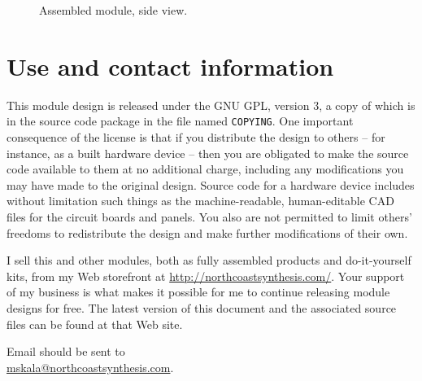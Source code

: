 \begin{figure}
{\centering
{}\par}
\caption{Assembled module, side view.}\label{fig:panel-stack}
\end{figure}

\section{Use and contact information}

This module design is released under the GNU GPL, version 3, a copy of which
is in the source code package in the file named \texttt{COPYING}.  One
important consequence of the license is that if you distribute the design to
others -- for instance, as a built hardware device -- then you are obligated
to make the source code available to them at no additional charge, including
any modifications you may have made to the original design.  Source code for
a hardware device includes without limitation such things as the
machine-readable, human-editable CAD files for the circuit boards and
panels.  You also are not permitted to limit others' freedoms to
redistribute the design and make further modifications of their own.

I sell this and other modules, both as fully assembled products and
do-it-yourself kits, from my Web storefront at
\url{http://northcoastsynthesis.com/}.  Your support of my business is what
makes it possible for me to continue releasing module designs for free. 
The latest version of this document and the associated source files can be
found at that Web site.

Email should be sent to\\ \url{mskala@northcoastsynthesis.com}.
